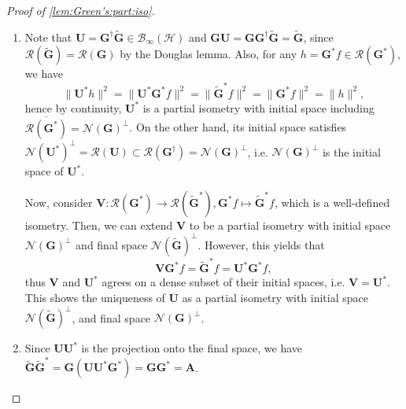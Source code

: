 \documentclass[noinfoline]{imsart}\setcounter{tocdepth}{2}
\newcommand{\m}[1]{\mathbf{#1}} %
\renewcommand{\c}[1]{\mathcal{#1}} %
\theoremstyle{plain}
\begin{document}
\begin{proof}[Proof of \cref{lem:Green's:part:iso}] \quad
\begin{enumerate}[leftmargin=*]
\item Note that $\m{U} = \m{G}^{\dagger} \tilde{\m{G}} \in \c{B}_{\infty}(\c{H})$ and $\m{G} \m{U} = \m{G} \m{G}^{\dagger} \tilde{\m{G}} = \tilde{\m{G}}$, since $\c{R}(\tilde{\m{G}}) = \c{R}(\m{G})$ by the Douglas lemma. Also, for any $h = \m{G}^{*} f \in \c{R}(\m{G}^{*})$, we have
\begin{equation*}
    \|\m{U}^{*} h\|^{2} = \|\m{U}^{*} \m{G}^{*} f\|^{2} = \|\tilde{\m{G}}^{*} f\|^{2} = \|\m{G}^{*} f\|^{2} = \|h\|^{2},
\end{equation*}
hence by continuity, $\m{U}^{*}$ is a partial isometry with initial space including $\overline{\c{R}(\m{G}^{*})} = \c{N}(\m{G})^{\perp}$. On the other hand, its initial space satisfies $\c{N}(\m{U}^{*})^{\perp} = \c{R}(\m{U}) \subset \c{R}(\m{G}^{\dagger}) = \c{N}(\m{G})^{\perp}$, i.e. $\c{N}(\m{G})^{\perp}$ is the initial space of $\m{U}^{*}$.


Now, consider $\m{V}: \c{R}(\m{G}^{*}) \to \c{R}(\tilde{\m{G}}^{*}), \m{G}^{*} f \mapsto \tilde{\m{G}}^{*} f$, which is a well-defined isometry. Then, we can extend $\m{V}$ to be a partial isometry with initial space $\c{N}(\m{G})^{\perp}$ and final space $\c{N}(\tilde{\m{G}})^{\perp}$. However, this yields that
\begin{equation*}
    \m{V} \m{G}^{*} f = \tilde{\m{G}}^{*} f = \m{U}^{*} \m{G}^{*} f,
\end{equation*}
thus $\m{V}$ and $\m{U}^{*}$ agrees on a dense subset of their initial spaces, i.e. $\m{V} = \m{U}^{*}$. This shows the uniqueness of $\m{U}$ as a partial isometry  with initial space $\c{N}(\tilde{\m{G}})^{\perp}$, and final space $\c{N}(\m{G})^{\perp}$.

\item Since $\m{U} \m{U}^{*}$ is the projection onto the final space, we have $\tilde{\m{G}} \tilde{\m{G}}^{*} = \m{G} (\m{U} \m{U}^{*} \m{G}^{*}) = \m{G} \m{G}^{*} = \m{A}$.
\end{enumerate}
\end{proof}
\end{document}
